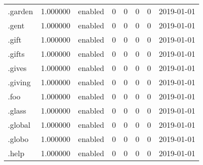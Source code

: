 \begin{tabular}{lrlrrrrl}
.garden                   &          1.000000 &         enabled &                           0 &                           0 &                           0 &                   0 &           2019-01-01 \\
.gent                     &          1.000000 &         enabled &                           0 &                           0 &                           0 &                   0 &           2019-01-01 \\
.gift                     &          1.000000 &         enabled &                           0 &                           0 &                           0 &                   0 &           2019-01-01 \\
.gifts                    &          1.000000 &         enabled &                           0 &                           0 &                           0 &                   0 &           2019-01-01 \\
.gives                    &          1.000000 &         enabled &                           0 &                           0 &                           0 &                   0 &           2019-01-01 \\
.giving                   &          1.000000 &         enabled &                           0 &                           0 &                           0 &                   0 &           2019-01-01 \\
.foo                      &          1.000000 &         enabled &                           0 &                           0 &                           0 &                   0 &           2019-01-01 \\
.glass                    &          1.000000 &         enabled &                           0 &                           0 &                           0 &                   0 &           2019-01-01 \\
.global                   &          1.000000 &         enabled &                           0 &                           0 &                           0 &                   0 &           2019-01-01 \\
.globo                    &          1.000000 &         enabled &                           0 &                           0 &                           0 &                   0 &           2019-01-01 \\
.help                     &          1.000000 &         enabled &                           0 &                           0 &                           0 &                   0 &           2019-01-01 \\

\end{tabular}
